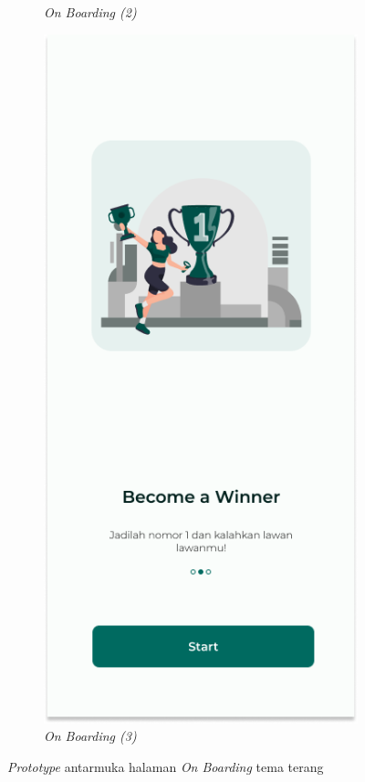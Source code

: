 \begin{figure}[H]
\begin{subfigure}[b]{0.25\textwidth}
	  \caption{\textit{On Boarding (2)}}
	  \label{fig:HasilBoarding2}
	\end{subfigure}
	\begin{subfigure}[b]{0.25\textwidth}
		\centering
	  \includegraphics[width=\linewidth]{contents/chapter-3/images/HF-Boarding-3.png}
	  \caption{\textit{On Boarding (3)}}
	  \label{fig:HasilBoarding3}
	\end{subfigure}
	\caption{\textit{Prototype} antarmuka halaman \textit{On Boarding} tema terang}
	\label{Fig:HasilFeatureSetBoarding}
\end{figure}
